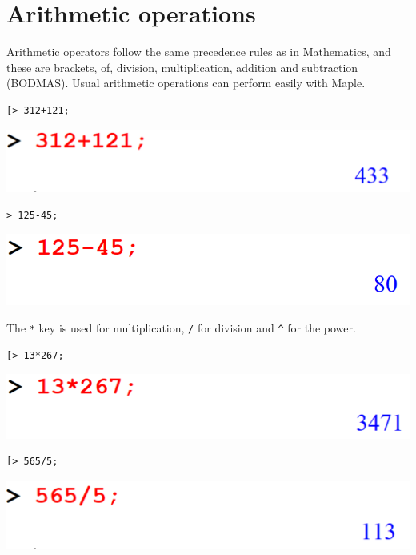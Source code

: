 \documentclass[
]{book}
\theoremstyle{definition}
\theoremstyle{definition}
\theoremstyle{definition}
\theoremstyle{definition}
\theoremstyle{remark}
\begin{document}
\section{Arithmetic operations}\label{arithmetic-operations}

Arithmetic operators follow the same precedence rules as in Mathematics, and these are brackets, of, division, multiplication, addition and subtraction (BODMAS). Usual arithmetic operations can perform easily with Maple.

\begin{verbatim}
[> 312+121;
\end{verbatim}

\includegraphics{figures/Lesson 1/fig4.png}

\begin{verbatim}
> 125-45;
\end{verbatim}

\includegraphics{figures/Lesson 1/fig5.png}

The \texttt{*} key is used for multiplication, \texttt{/} for division and \texttt{\^{}} for the power.

\begin{verbatim}
[> 13*267;
\end{verbatim}

\includegraphics{figures/Lesson 1/fig6.png}

\begin{verbatim}
[> 565/5;
\end{verbatim}

\includegraphics{figures/Lesson 1/fig7.png}
\end{document}
